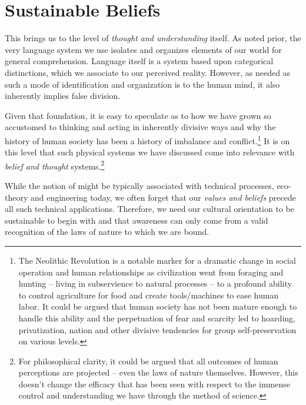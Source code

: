 \documentclass[10pt, a4paper, cleardoubleempty, openright, twoside]{book}
\begin{document}
\section {Sustainable Beliefs}

This brings us to the level of \emph{thought and understanding} itself.
As noted prior, the very language system we use isolates and organizes
elements of our world for general comprehension. Language itself is a
system based upon categorical distinctions, which we associate to our
perceived reality. However, as needed as such a mode of identification
and organization is to the human mind, it also inherently implies false
division.

Given that foundation, it is easy to speculate as to how we have grown
so accustomed to thinking and acting in inherently divisive ways and why
the history of human society has been a history of imbalance and
conflict.\footnote{
	The Neolithic Revolution is a notable marker for a dramatic change in
	social operation and human relationships as civilization went from
	foraging and hunting -- living in subservience to natural processes --
	to a profound ability to control agriculture for food and create
	tools/machines to ease human labor. It could be argued that human
	society has not been mature enough to handle this ability and the
	perpetuation of fear and scarcity led to hoarding, privatization,
	nation  and other divisive tendencies for group
	self-preservation on various levels.
} 
It is on this level that such physical systems we have discussed come
into relevance with \emph{belief and thought} systems.\footnote{
	For philosophical clarity, it could be argued that all outcomes of
	human perceptions are projected -- even the laws of nature themselves.
	However, this doesn't change the efficacy that has been seen with
	respect to the immense control and understanding we have through the
	method of science.
}

While the notion of  might be typically
associated with technical processes, eco-theory and engineering today,
we often forget that our \emph{values and beliefs} precede all such
technical applications. Therefore, we need our cultural orientation to
be sustainable to begin with and that awareness can only come from a
valid recognition of the laws of nature to which we are bound.
\end{document}
